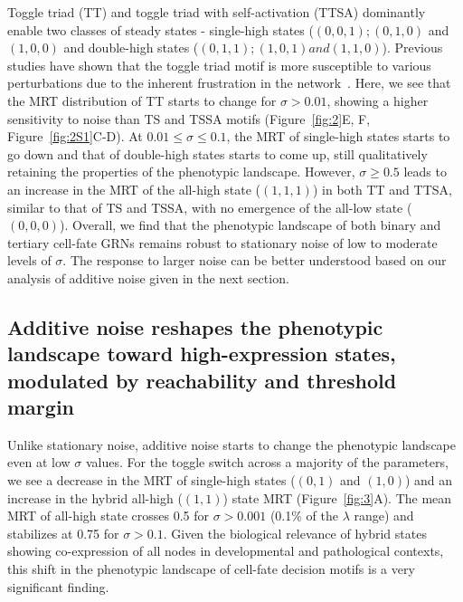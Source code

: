 \documentclass[11pt]{article}
\begin{document}
Toggle triad (TT) and toggle triad with self-activation (TTSA) dominantly enable two classes of steady states - single-high states ($(0, 0, 1); (0, 1, 0)$ and $(1, 0, 0)$ and double-high states ($(0, 1, 1); (1, 0, 1) and (1, 1, 0)$). Previous studies have shown that the toggle triad motif is more susceptible to various perturbations due to the inherent frustration in the network~\cite{harlapur2022functional, doi:10.1098/rsif.2020.0631}. Here, we see that the MRT distribution of TT starts to change for $\sigma > 0.01$, showing a higher sensitivity to noise than TS and TSSA motifs (Figure~\ref{fig:2}E, F, Figure~\ref{fig:2S1}C-D). At $0.01 \leq \sigma \leq 0.1$, the MRT of single-high states starts to go down and that of double-high states starts to come up, still qualitatively retaining the properties of the phenotypic landscape. However, $\sigma \geq 0.5$ leads to an increase in the MRT of the all-high state ($(1, 1, 1)$) in both TT and TTSA, similar to that of TS and TSSA, with no emergence of the all-low state ($(0, 0, 0)$). Overall, we find that the phenotypic landscape of both binary and tertiary cell-fate GRNs remains robust to stationary noise of low to moderate levels of $\sigma$. The response to larger noise can be better understood based on our analysis of additive noise given in the next section. 


\subsection{Additive noise reshapes the phenotypic landscape toward high-expression states, modulated by reachability and threshold margin}

Unlike stationary noise, additive noise starts to change the phenotypic landscape even at low $\sigma$ values. For the toggle switch across a majority of the parameters, we see a decrease in the MRT of single-high states ($(0, 1)$ and $(1, 0)$) and an increase in the hybrid all-high ($(1, 1)$) state MRT (Figure~\ref{fig:3}A). The mean MRT of all-high state crosses 0.5 for $\sigma > 0.001$ (0.1\% of the $\lambda$ range) and stabilizes at 0.75 for $\sigma > 0.1$. Given the biological relevance of hybrid states showing co-expression of all nodes in developmental and pathological contexts, this shift in the phenotypic landscape of cell-fate decision motifs is a very significant finding. 
\end{document}
